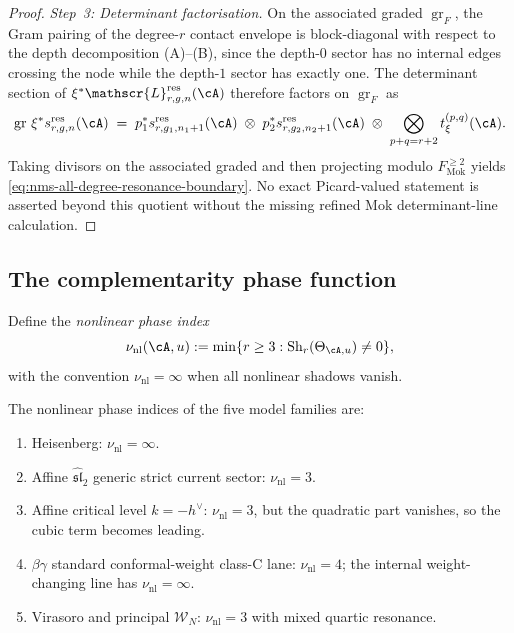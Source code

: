 \begin{proof}
\emph{Step~3: Determinant factorisation.}
On the associated graded $\operatorname{gr}_F$, the Gram
pairing of the degree-$r$ contact envelope is block-diagonal
with respect to the depth decomposition (A)--(B), since the
depth-$0$ sector has no internal edges crossing the node while
the depth-$1$ sector has exactly one. The determinant section
of $\xi^*\mathscr{L}^{\mathrm{res}}_{r,g,n}(\cA)$ therefore
factors on $\operatorname{gr}_F$ as
\[
\operatorname{gr}\,\xi^*s_{r,g,n}^{\mathrm{res}}(\cA)
\;=\;
p_1^*s_{r,g_1,n_1+1}^{\mathrm{res}}(\cA)
\;\otimes\;
p_2^*s_{r,g_2,n_2+1}^{\mathrm{res}}(\cA)
\;\otimes\;
\bigotimes_{p+q=r+2} t^{(p,q)}_\xi(\cA).
\]
Taking divisors on the associated graded and then projecting modulo
$F_{\mathrm{Mok}}^{\ge2}$ yields
\eqref{eq:nms-all-degree-resonance-boundary}. No exact Picard-valued
statement is asserted beyond this quotient without the missing refined
Mok determinant-line calculation.
\end{proof}

\subsection{The complementarity phase function}
\label{subsec:nms-complementarity-phase-function}

\begin{definition}
\label{def:nms-nonlinear-phase-index}
%
Define the \emph{nonlinear phase index}
\[
\nu_{\mathrm{nl}}(\cA,u):=
\min\{r\ge 3: \mathrm{Sh}_r(\Theta_{\cA,u})\neq 0\},
\]
with the convention $\nu_{\mathrm{nl}}=\infty$ when all nonlinear shadows vanish.
\end{definition}

\begin{theorem}
\label{thm:nms-nonlinear-phase-standard}
The nonlinear phase indices of the five model families are:
\begin{enumerate}[label=\textup{(\roman*)}]
\item Heisenberg: $\nu_{\mathrm{nl}}=\infty$.
\item Affine $\widehat{\mathfrak{sl}}_2$ generic strict current sector: $\nu_{\mathrm{nl}}=3$.
\item Affine critical level $k=-h^\vee$: $\nu_{\mathrm{nl}}=3$, but the quadratic part vanishes, so the cubic term becomes leading.
\item $\beta\gamma$ standard conformal-weight class-C lane:
$\nu_{\mathrm{nl}}=4$; the internal weight-changing line has
$\nu_{\mathrm{nl}}=\infty$.
\item Virasoro and principal $\mathcal W_N$: $\nu_{\mathrm{nl}}=3$ with mixed quartic resonance.
\end{enumerate}
\end{theorem}

